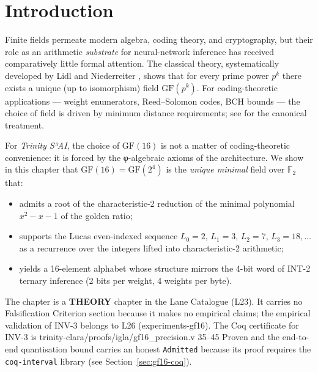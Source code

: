 \section{Introduction}
\label{sec:gf16-intro}

Finite fields permeate modern algebra, coding theory, and cryptography, but
their role as an arithmetic \emph{substrate} for neural-network inference has
received comparatively little formal attention.
The classical theory, systematically developed by Lidl and Niederreiter
\cite{lidl_finite_fields}, shows that for every prime power \(p^{k}\) there
exists a unique (up to isomorphism) field \(\mathrm{GF}(p^{k})\).
For coding-theoretic applications — weight enumerators, Reed–Solomon codes,
BCH bounds — the choice of field is driven by minimum distance requirements;
see \textcite{macwilliams_sloane} for the canonical treatment.

For \emph{Trinity S³AI}, the choice of \(\mathrm{GF}(16)\) is not a matter
of coding-theoretic convenience: it is forced by the φ-algebraic axioms of
the architecture.
We show in this chapter that \(\mathrm{GF}(16) = \mathrm{GF}(2^{4})\)
is the \emph{unique minimal} field over \(\mathbb{F}_2\) that:
\begin{itemize}
  \item admits a root of the characteristic-2 reduction of the
        minimal polynomial \(x^{2}-x-1\) of the golden ratio;
  \item supports the Lucas even-indexed sequence
        \(L_0=2,\, L_1=3,\, L_2=7,\, L_3=18,\ldots\)
        as a recurrence over the integers lifted into characteristic-2 arithmetic;
  \item yields a 16-element alphabet whose structure mirrors the 4-bit word of
        INT-2 ternary inference (2 bits per weight, 4 weights per byte).
\end{itemize}

The chapter is a \textbf{THEORY} chapter in the Lane Catalogue (L23).
It carries no Falsification Criterion section because it makes no empirical
claims; the empirical validation of INV-3 belongs to L26 (experiments-gf16).
The Coq certificate for INV-3 is
%
       {trinity-clara/proofs/igla/gf16\_precision.v}%
       {35--45}%
       {Proven}
and the end-to-end quantisation bound carries an honest \texttt{Admitted}
because its proof requires the \texttt{coq-interval} library
(see Section~\ref{sec:gf16-coq}).

